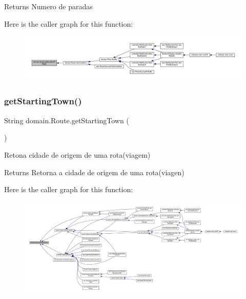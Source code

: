 \begin{DoxyReturn}{Returns}
Numero de paradas 
\end{DoxyReturn}
Here is the caller graph for this function\+:\nopagebreak
\begin{figure}[H]
\begin{center}
\leavevmode
\includegraphics[width=350pt]{classdomain_1_1_route_a863264da3af911c200d94f53733e07b4_icgraph}
\end{center}
\end{figure}
\mbox{\label{classdomain_1_1_route_a63676b06b623621dbde9a06126bf4b5c}} 
\subsubsection{\texorpdfstring{get\+Starting\+Town()}{getStartingTown()}}
{\footnotesize\ttfamily String domain.\+Route.\+get\+Starting\+Town (\begin{DoxyParamCaption}{ }\end{DoxyParamCaption})}

Retona cidade de origem de uma rota(viagem)

\begin{DoxyReturn}{Returns}
Retorna a cidade de origem de uma rota(viagen) 
\end{DoxyReturn}
Here is the caller graph for this function\+:\nopagebreak
\begin{figure}[H]
\begin{center}
\leavevmode
\includegraphics[width=350pt]{classdomain_1_1_route_a63676b06b623621dbde9a06126bf4b5c_icgraph}
\end{center}
\end{figure}
\mbox{\label{classdomain_1_1_route_addbf041cdbb4a24ff5f0b2a6fbce4c7d}} 
